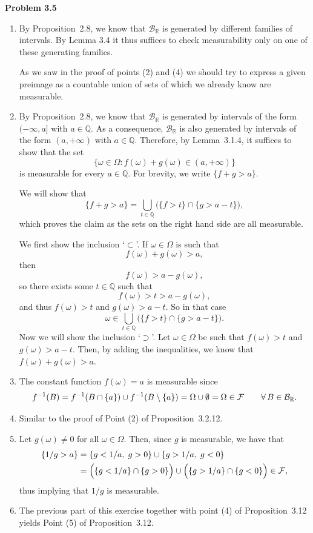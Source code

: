 \textbf{Problem 3.5}
\begin{enumerate}[label=(\alph*)]
\item By Proposition~2.8, we know that $\mathcal{B}_\mathbb{R}$ is generated by different families of intervals. By Lemma 3.4 it thus suffices to check measurability only on one of these generating families.

As we saw in the proof of points (2) and (4) we should try to express a given preimage as a countable union of sets of which we already know are measurable.

\item By Proposition~2.8, we know that $\mathcal{B}_\mathbb{R}$ is generated by intervals of the form $(-\infty,a]$ with $a \in \mathbb{Q}$. 
As a consequence, $\mathcal{B}_\mathbb{R}$ is also generated by intervals of the form $(a, +\infty)$ with $a \in \mathbb{Q}$.
Therefore, by Lemma~3.1.4, it suffices to show that the set
\[
	\bigl\{ \omega \in \Omega : f(\omega) + g(\omega) \in (a,+\infty) \bigr\}
\]
is measurable for every $a \in \mathbb{Q}$. For brevity, we write $\{ f + g > a\}$. 

We will show that
\[
	\{ f + g > a\} = \bigcup_{t \in \mathbb{Q}} \Big(\{ f > t \} \cap \{ g > a - t  \} \Big),
\]
which proves the claim as the sets on the right hand side are all measurable.

We first show the inclusion `$\subset$'. If $\omega \in \Omega$ is such that
\[
	f(\omega) + g(\omega) > a,
\]
then 
\[
	f(\omega) > a - g(\omega),
\]
so there exists some $t \in \mathbb{Q}$ such that
\[
	f(\omega) > t > a - g(\omega),
\]
and thus $f(\omega) > t$ and $g(\omega) > a - t$.
So in that case
\[
	\omega \in \bigcup_{t \in \mathbb{Q}}\Big(\{ f > t \} \cap \{ g > a - t  \}\Big).
\]
Now we will show the inclusion `$\supset$'. 
Let $\omega \in \Omega$ be such that $f(\omega) > t$ and $g(\omega) > a - t$. 
Then, by adding the inequalities, we know that $f(\omega) + g(\omega) > a$. 

	\item The constant function $f(\omega)=a$ is measurable since 
	\[
		f^{-1}(B) = f^{-1}(B\cap\{a\})\cup f^{-1}(B\setminus \{a\}) = \Omega\cup \emptyset = \Omega\in \mathcal F\qquad\forall\,B\in\mathcal B_{\mathbb R}.
	\]
	
	\item Similar to the proof of Point (2) of Proposition~3.2.12.
	\item Let $g(\omega)\ne 0$ for all $\omega\in\Omega$. Then, since $g$ is measurable, we have that
	\begin{align*}
		\{ 1/g > a\} &= \{ g < 1/a,\;g>0\}\cup \{ g > 1/a,\; g<0\} \\
		&= \Bigl(\{ g < 1/a\}\cap \{g>0\}\Bigr) \cup \Bigl(\{ g > 1/a\}\cap\{g<0\}\Bigr) \in \mathcal F,
	\end{align*}
	thus implying that $1/g$ is measurable.
	
	\item The previous part of this exercise together with point (4) of Proposition~3.12 yields Point (5) of Proposition~3.12.
\end{enumerate}

